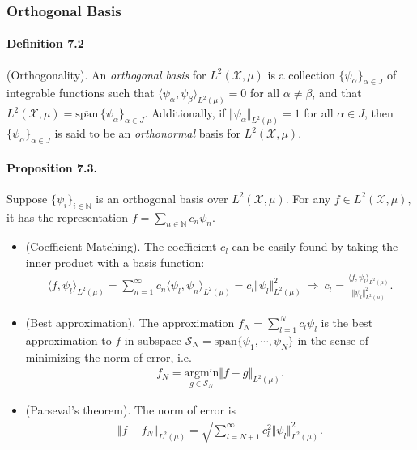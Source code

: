 \documentclass{article}
\begin{document}
\subsubsection{Orthogonal Basis}
\paragraph{Definition 7.2} (Orthogonality). An \textit{orthogonal basis} for $L^2(\mathcal{X},\mu)$ is a collection $\lbrace \psi_\alpha\rbrace_{\alpha\in J}$ of integrable functions such that $\langle \psi_\alpha,\psi_\beta\rangle_{L^2(\mu)} = 0$ for all $\alpha\neq\beta$, and that $L^2(\mathcal{X},\mu)=\overline{\mathrm{span}}\,\lbrace \psi_\alpha\rbrace_{\alpha\in J}$. Additionally, if $\Vert\psi_\alpha\Vert_{L^2(\mu)}=1$ for all $\alpha\in J$, then $\{\psi_\alpha\}_{\alpha\in J}$ is said to be an \textit{orthonormal} basis for $L^2(\mathcal{X},\mu)$.

\paragraph{Proposition 7.3.} Suppose $\lbrace \psi_ i\rbrace_ {i\in\mathbb{N}}$ is an orthogonal basis over $L^2(\mathcal{X},\mu).$ For any $f\in L^2(\mathcal{X},\mu),$ it has the representation $f=\sum_ {n\in\mathbb{N}} c_n\psi_n.$
\begin{itemize}
	\vspace{0.1cm}
	\item (Coefficient Matching). The coefficient $c_l$ can be easily found by taking the inner product with a basis function:
	\begin{align*}
		\langle f,\psi_l\rangle_{L^2(\mu)} = \sum_{n=1}^\infty c_n\langle \psi_l,\psi_n\rangle_{L^2(\mu)} = c_l\Vert\psi_l\Vert_{L^2(\mu)}^2\ \Longrightarrow\ c_l = \frac{\langle f,\psi_l\rangle_{L^2(\mu)}}{\Vert\psi_l\Vert_{L^2(\mu)}^2}.\tag{7.19}
	\end{align*}
	\item (Best approximation). The approximation
	$f_N=\sum_{l=1}^N c_l\psi_l$
	is the best approximation to $f$ in subspace $\mathcal{S}_N=\mathrm{span}\lbrace\psi_1,\cdots,\psi_N\rbrace$ in the sense of minimizing the norm of error, i.e.
	\begin{align*}
		f_N = \underset{g\in\mathcal{S}_N}{\mathrm{argmin}} \Vert f - g\Vert_{L^2(\mu)}.\tag{7.20}
	\end{align*}
	\item (Parseval's theorem). The norm of error is
	\begin{align*}
		\Vert f-f_N\Vert_{L^2(\mu)} = \sqrt{\sum_{l=N+1}^\infty c_l^2\Vert \psi_l\Vert_{L^2(\mu)}^2}.\tag{7.21}
	\end{align*}
\end{itemize} 
\end{document}
